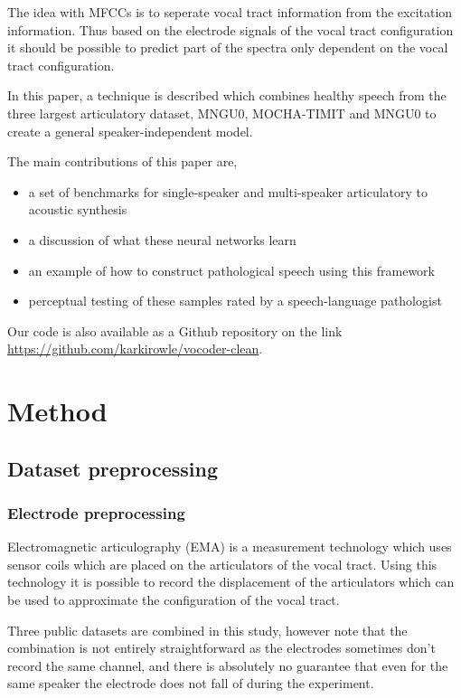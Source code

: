 \documentclass[a4paper]{article}
\begin{document}
The idea with MFCCs is to seperate vocal tract information from the excitation
information. Thus based on the electrode signals of the vocal tract configuration
it should be possible to predict part of the spectra only dependent on the vocal
tract configuration.

In this paper, a technique is described which combines healthy speech from the three largest articulatory dataset, MNGU0, MOCHA-TIMIT and MNGU0 to create a general speaker-independent model. 

The main contributions of this paper are,
\begin{itemize}
\item a set of benchmarks for single-speaker and multi-speaker articulatory to acoustic synthesis
\item a discussion of what these neural networks learn
\item an example of how to construct pathological speech using this framework
\item perceptual testing of these samples rated by a speech-language pathologist
\end{itemize}

Our code is also available as a Github repository on the link
\url{https://github.com/karkirowle/vocoder-clean}.

\section{Method}
\subsection{Dataset preprocessing}

\subsubsection{Electrode preprocessing}

Electromagnetic articulography (EMA) is a measurement technology which uses
sensor coils which are placed on the articulators of the vocal tract.
Using this technology it is possible to record the displacement of the articulators
which can be used to approximate the configuration of the vocal tract.

Three public datasets are combined in this study, however note that the combination is not
entirely straightforward as the electrodes sometimes don't record the same channel, and there is absolutely no guarantee that even for the same speaker the electrode does not fall of during the experiment.
\end{document}

